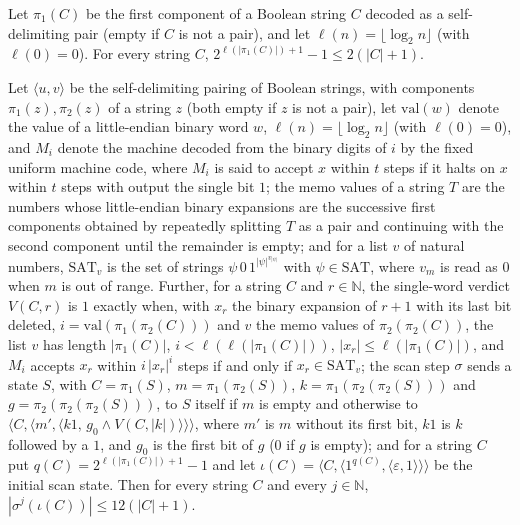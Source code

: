 \begin{theorem}
\label{Complexity.ladner_queryCount_le}
\leanok
{}
Let $\pi_1(C)$ be the first component of a Boolean string $C$ decoded as a self-delimiting pair
(empty if $C$ is not a pair), and let $\ell(n)=\lfloor\log_2 n\rfloor$ (with $\ell(0)=0$). For every string $C$,
$2^{\ell(|\pi_1(C)|)+1}-1\le 2(|C|+1)$.
\end{theorem}

\begin{theorem}
\label{Complexity.ladner_test_size}
\leanok
{}
Let $\langle u,v\rangle$ be the self-delimiting pairing of Boolean strings, with components $\pi_1(z),\pi_2(z)$ of a string $z$ (both empty if $z$ is not a pair), let $\mathrm{val}(w)$ denote the value of a little-endian binary word $w$, $\ell(n)=\lfloor\log_2 n\rfloor$ (with $\ell(0)=0$), and $M_i$ denote the machine decoded from the binary digits of $i$ by the fixed uniform machine code, where $M_i$ is said to accept $x$ within $t$ steps if it halts on $x$ within $t$ steps with output the single bit $1$; the memo values of a string $T$ are the numbers whose little-endian binary expansions are the successive first components obtained by repeatedly splitting $T$ as a pair and continuing with the second component until the remainder is empty; and for a list $v$ of natural numbers, $\mathrm{SAT}_v$ is the set of strings $\psi\,0\,1^{|\psi|^{v_{|\psi|}}}$ with $\psi\in\mathrm{SAT}$, where $v_m$ is read as $0$ when $m$ is out of range. Further, for a string $C$ and $r\in\mathbb N$, the single-word verdict $V(C,r)$ is $1$ exactly when, with $x_r$ the binary expansion of $r+1$ with its last bit deleted, $i=\mathrm{val}(\pi_1(\pi_2(C)))$ and $v$ the memo values of $\pi_2(\pi_2(C))$, the list $v$ has length $|\pi_1(C)|$, $i<\ell(\ell(|\pi_1(C)|))$, $|x_r|\le\ell(|\pi_1(C)|)$, and $M_i$ accepts $x_r$ within $i\,|x_r|^i$ steps if and only if $x_r\in\mathrm{SAT}_v$; the scan step $\sigma$ sends a state $S$, with $C=\pi_1(S)$, $m=\pi_1(\pi_2(S))$, $k=\pi_1(\pi_2(\pi_2(S)))$ and $g=\pi_2(\pi_2(\pi_2(S)))$, to $S$ itself if $m$ is empty and otherwise to $\langle C,\langle m',\langle k1,\,g_0\wedge V(C,|k|)\rangle\rangle\rangle$, where $m'$ is $m$ without its first bit, $k1$ is $k$ followed by a $1$, and $g_0$ is the first bit of $g$ ($0$ if $g$ is empty); and for a string $C$ put $q(C)=2^{\ell(|\pi_1(C)|)+1}-1$ and let $\iota(C)=\langle C,\langle 1^{q(C)},\langle\varepsilon,1\rangle\rangle\rangle$ be the initial scan state.
Then for every string $C$ and every $j\in\mathbb N$, $|\sigma^{j}(\iota(C))|\le 12(|C|+1)$.
\end{theorem}

